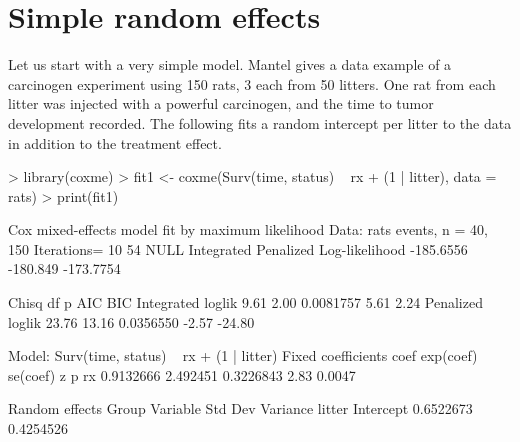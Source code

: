 \documentclass{article}
\begin{document}
\section{Simple random effects}
Let us start with a very simple model.  
Mantel \cite{Mantel} gives a data example of a carcinogen experiment
using 150 rats, 3 each from 50 litters.  One rat from each
litter was injected with a powerful carcinogen, and the time
to tumor development recorded. The following fits a 
random intercept per litter  to the data in addition to the
treatment effect.
\begin{Schunk}
\begin{Sinput}
> library(coxme)
> fit1 <- coxme(Surv(time, status) ~ rx + (1 | litter), data = rats)
> print(fit1)
\end{Sinput}
\begin{Soutput}
Cox mixed-effects model fit by maximum likelihood
  Data: rats
  events, n = 40, 150
  Iterations= 10 54 
                    NULL Integrated Penalized
Log-likelihood -185.6556   -180.849 -173.7754

                  Chisq    df         p   AIC    BIC
Integrated loglik  9.61  2.00 0.0081757  5.61   2.24
 Penalized loglik 23.76 13.16 0.0356550 -2.57 -24.80

Model:  Surv(time, status) ~ rx + (1 | litter) 
Fixed coefficients
        coef exp(coef)  se(coef)    z      p
rx 0.9132666  2.492451 0.3226843 2.83 0.0047

Random effects
 Group  Variable  Std Dev   Variance 
 litter Intercept 0.6522673 0.4254526
\end{Soutput}
\end{Schunk}
\end{document}
